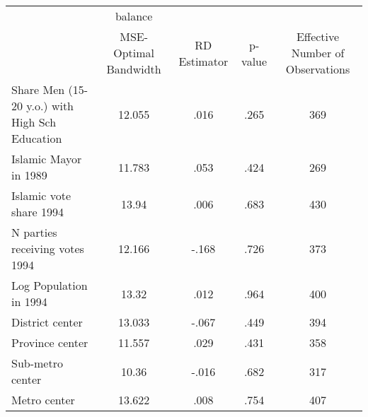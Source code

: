 \begin{tabular}{l*{4}{c}}
\hline\hline
            &     balance&            &            &            \\
            &MSE-Optimal Bandwidth&RD Estimator&     p-value&Effective Number of Observations\\
\hline
Share Men (15-20 y.o.) with High Sch Education&      12.055&        .016&        .265&         369\\
Islamic Mayor in 1989&      11.783&        .053&        .424&         269\\
Islamic vote share 1994&       13.94&        .006&        .683&         430\\
N parties receiving votes 1994&      12.166&       -.168&        .726&         373\\
Log Population in 1994&       13.32&        .012&        .964&         400\\
District center&      13.033&       -.067&        .449&         394\\
Province center&      11.557&        .029&        .431&         358\\
Sub-metro center&       10.36&       -.016&        .682&         317\\
Metro center&      13.622&        .008&        .754&         407\\
\hline\hline
\end{tabular}
